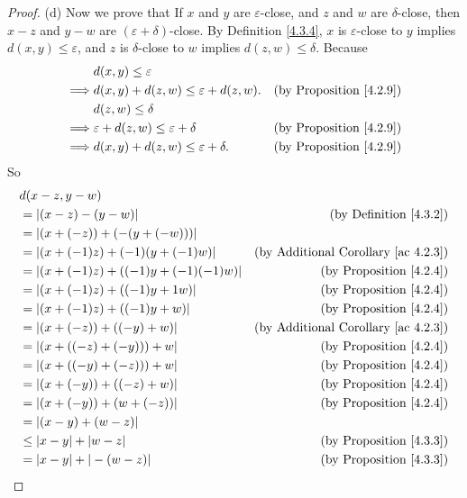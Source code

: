 \begin{proof}{(d)}
Now we prove that If \(x\) and \(y\) are \(\varepsilon\)-close, and \(z\) and \(w\) are \(\delta\)-close, then \(x - z\) and \(y - w\) are \((\varepsilon + \delta)\)-close.
By Definition \ref{4.3.4}, \(x\) is \(\varepsilon\)-close to \(y\) implies \(d(x, y) \leq \varepsilon\), and \(z\) is \(\delta\)-close to \(w\) implies \(d(z, w) \leq \delta\).
Because
\begin{align*}
& d(x, y) \leq \varepsilon \\
\implies & d(x, y) + d(z, w) \leq \varepsilon + d(z, w). & \text{(by Proposition \ref{4.2.9})} \\
& d(z, w) \leq \delta \\
\implies & \varepsilon + d(z, w) \leq \varepsilon + \delta & \text{(by Proposition \ref{4.2.9})} \\
\implies & d(x, y) + d(z, w) \leq \varepsilon + \delta. & \text{(by Proposition \ref{4.2.9})} \\
\end{align*}
So
\begin{align*}
& d(x - z, y - w) \\
&= |(x - z) - (y - w)| & \text{(by Definition \ref{4.3.2})} \\
&= |(x + (-z)) + (-(y + (-w)))| \\
&= |(x + (-1)z) + (-1)(y + (-1)w)| & \text{(by Additional Corollary \ref{ac 4.2.3})} \\
&= |(x + (-1)z) + ((-1)y + (-1)(-1)w)| & \text{(by Proposition \ref{4.2.4})} \\
&= |(x + (-1)z) + ((-1)y + 1w)| & \text{(by Proposition \ref{4.2.4})} \\
&= |(x + (-1)z) + ((-1)y + w)| & \text{(by Proposition \ref{4.2.4})} \\
&= |(x + (-z)) + ((-y) + w)| & \text{(by Additional Corollary \ref{ac 4.2.3})} \\
&= |(x + ((-z) + (-y))) + w| & \text{(by Proposition \ref{4.2.4})} \\
&= |(x + ((-y) + (-z))) + w| & \text{(by Proposition \ref{4.2.4})} \\
&= |(x + (-y)) + ((-z) + w)| & \text{(by Proposition \ref{4.2.4})} \\
&= |(x + (-y)) + (w + (-z))| & \text{(by Proposition \ref{4.2.4})} \\
&= |(x - y) + (w - z)| \\
&\leq |x - y| + |w - z| & \text{(by Proposition \ref{4.3.3})} \\
&= |x - y| + |-(w - z)| & \text{(by Proposition \ref{4.3.3})} \\

\end{align*}
\end{proof}
